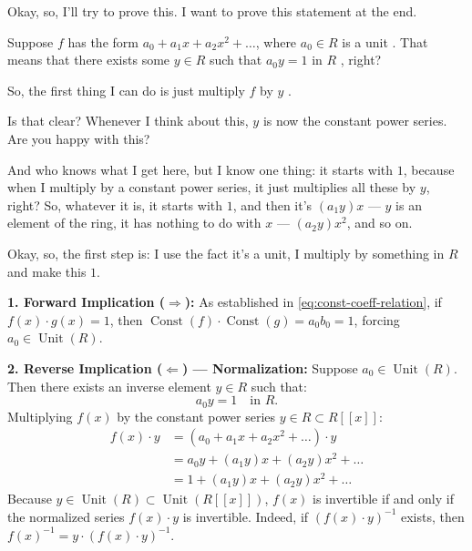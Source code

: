 \begin{proofWrapper}

\begin{speech}[00:37:45 - 00:39:07]
Okay, so, I'll try to prove this. I want to prove this statement at the end.

Suppose $f$ has the form $a_0 + a_1 x + a_2 x^2 + \dots$, where $a_0 \in R$ is a unit . That means that there exists some $y \in R$ such that $a_0 y = 1$ in $R$ , right?

So, the first thing I can do is just multiply $f$ by $y$ .

Is that clear? Whenever I think about this, $y$ is now the constant power series. Are you happy with this?

And who knows what I get here, but I know one thing: it starts with $1$, because when I multiply by a constant power series, it just multiplies all these by $y$, right? So, whatever it is, it starts with $1$, and then it's $(a_1 y) x$  --- $y$ is an element of the ring, it has nothing to do with $x$ --- $(a_2 y) x^2$, and so on.

Okay, so, the first step is: I use the fact it's a unit, I multiply by something in $R$ and make this $1$.
\end{speech}

\begin{content}
\textbf{1. Forward Implication ($\Rightarrow$):}
As established in \eqref{eq:const-coeff-relation}, if $f(x) \cdot g(x) = 1$, then $\operatorname{Const}(f) \cdot \operatorname{Const}(g) = a_0 b_0 = 1$, forcing $a_0 \in \operatorname{Unit}(R)$.

\textbf{2. Reverse Implication ($\Leftarrow$) --- Normalization:}
Suppose $a_0 \in \operatorname{Unit}(R)$. Then there exists an inverse element $y \in R$ such that:
\begin{equation}\label{eq:y-inverse-a0}
a_0 y = 1 \quad \text{in } R.
\end{equation}
Multiplying $f(x)$ by the constant power series $y \in R \subset R[[x]]$:
\begin{align}
    f(x) \cdot y &= (a_0 + a_1 x + a_2 x^2 + \dots) \cdot y \nonumber \\
    &= a_0 y + (a_1 y) x + (a_2 y) x^2 + \dots \nonumber \\
    &= 1 + (a_1 y) x + (a_2 y) x^2 + \dots \label{eq:normalized-series-fy}
\end{align}
Because $y \in \operatorname{Unit}(R) \subset \operatorname{Unit}(R[[x]])$, $f(x)$ is invertible if and only if the normalized series $f(x) \cdot y$ is invertible. Indeed, if $(f(x) \cdot y)^{-1}$ exists, then $f(x)^{-1} = y \cdot (f(x) \cdot y)^{-1}$.
\end{content}


\end{proofWrapper}
